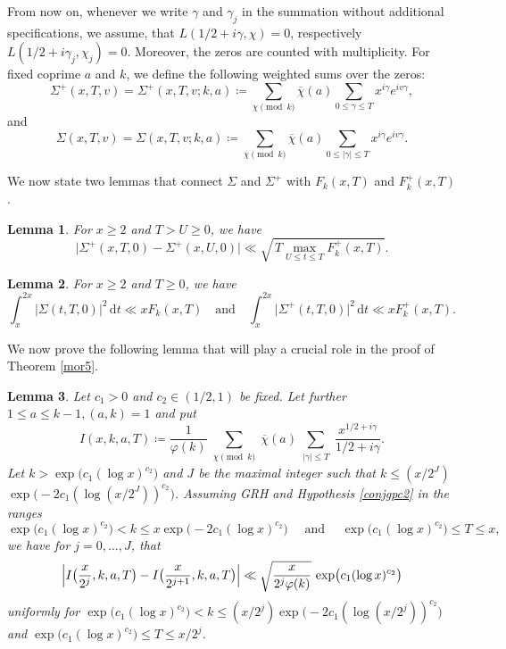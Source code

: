 \documentclass[pdflatex]{sn-jnl}%
\newcommand{\dx}{\mathrm{d}}
\theoremstyle{sltheorems}
\newtheorem{lem}{Lemma}
\theoremstyle{plainrem}
\theoremstyle{definition}
\begin{document}
From now on, whenever we write $\gamma$ and $\gamma_j$ in the summation 
without additional specifications, we assume, that $L(1/2 + i\gamma, \chi) = 0$,
respectively
$L(1/2 + i\gamma_j, \chi_ j) = 0$. Moreover, the zeros are counted with multiplicity.
For fixed coprime $a$ and $k$, we
define the following weighted sums over the zeros:
\begin{equation*}
\Sigma^+(x,T,v) 
=
\Sigma^+(x,T,v;k,a) 
\coloneq
\sum_{\chi \pmod{k}}
\overline{\chi} (a)
\sum_{0 \le  \gamma \le T} x^{i\gamma}e^{iv\gamma},
\end{equation*}
%
and
%
\begin{equation*}
\Sigma(x,T,v) 
=
\Sigma(x,T,v;k,a) 
\coloneq
\sum_{\chi \pmod{k}}
\overline{\chi} (a)
\sum_{0 \le \vert \gamma \vert \le T} x^{i\gamma}e^{iv\gamma}.
\end{equation*}

We now state two lemmas that connect $\Sigma$ and $\Sigma^+$
with $F_{k}(x,T)$ and $F_k^+(x,T)$.

\begin{lem}\label{lem3-mathannalen}\cite[Lemma\,6]{mathannalen}
For $x\ge 2$ and $T > U \ge 0$, we have 
\[
\vert
\Sigma^+(x,T,0) - \Sigma^+(x,U,0)
\vert
\ll 
\sqrt{\, T \max_{U \le  t \le T} F^{+}_{k}(x,T)}.
\]
\end{lem}

\begin{lem}\label{lemlp-mathannalen}\cite[Lemma\,7]{mathannalen}
For $x\ge 2$ and $T\ge 0$, we have 
\begin{equation*}
\int_{x}^{2x} \vert\Sigma(t,T,0) \vert^2 \, \dx t 
\ll 
 x F_k(x, T)
\quad 
\textrm{and}
\quad
\int_{x}^{2x} \vert \Sigma^+(t,T,0)  \vert^2 \, \dx t 
\ll 
 x F^+_k(x, T).  
\end{equation*}
\end{lem}

We now prove the following lemma that will play a crucial role in the proof 
of Theorem \ref{mor5}.

\begin{lem}\label{lem21}
Let $c_1>0$ and $c_2\in(1/2,1)$ be fixed.
Let further $1\le a \le k-1, (a, k)= 1$ and put
\[
I(x,k,a,T) 
\coloneq 
\frac{1}{\varphi(k)} 
\sum_{\substack{\chi \pmod{k}}} \overline{\chi}(a) \sum_{\substack{ \vert \gamma \vert  \le  T 
}} \frac{x^{1/2+ i\gamma}}{1/2 + i\gamma}.
\]
Let $k > \exp\bigl(c_1(\log x)^{c_2}\bigr)$
and $J$ be the maximal integer such that
$k\le (x/2^J)$ $\exp\bigl(- 2c_1 (\log (x/2^J))^{c_2}\bigr)$.
Assuming GRH and Hypothesis \ref{conjgpc2} in the ranges 
$$ \exp\bigl(c_1(\log x)^{c_2}\bigr)
< k \le x \exp\bigl(- 2c_1 (\log x)^{c_2}\bigr)\quad\text{~and~}\quad \exp\bigl(c_1(\log x)^{c_2}\bigr)
\le  T \le x,$$
we have for $j=0,\dots,J$, that
\[
\Bigl \vert  I\bigl(\frac{x}{2^j},k,a,T\bigr)- I\bigl(\frac{x}{2^{j+1}},k,a,T\bigr)\Bigr \vert 
\ll \sqrt{\frac{x}{2^j{\varphi(k)}}}\, \exp\bigl(c_1(\log x)^{c_2}\bigr)
\]
uniformly for
$ \exp\bigl(c_1(\log x)^{c_2}\bigr)
< k\le (x/2^j)\exp\bigl(-2c_1(\log (x/2^j))^{c_2}\bigr)$
and $ \exp\bigl(c_1(\log x)^{c_2}\bigr)
\le T \le  x/2^j$.
\end{lem}
\end{document}
